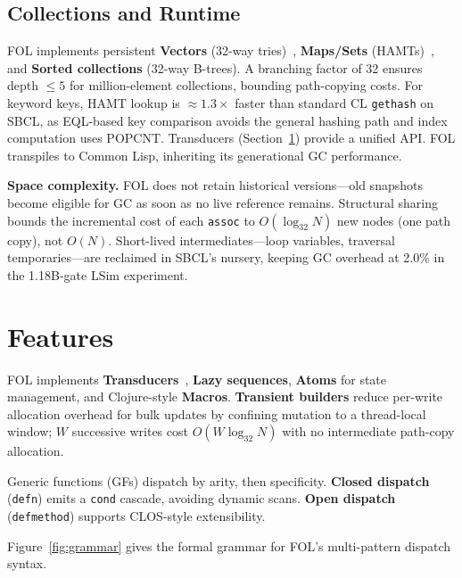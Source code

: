 \documentclass[sigconf,nonacm]{acmart}
\begin{document}
\subsection{Collections and Runtime}
FOL implements persistent \textbf{Vectors} (32-way tries)~\cite{Okasaki1998}, \textbf{Maps/Sets} (HAMTs)~\cite{Bagwell2000}, and \textbf{Sorted collections} (32-way B-trees). A branching factor of 32 ensures depth $\le 5$ for million-element collections, bounding path-copying costs. For keyword keys, HAMT lookup is $\approx$$1.3\times$ faster than standard CL \texttt{gethash} on SBCL, as EQL-based key comparison avoids the general hashing path and index computation uses POPCNT. Transducers (Section~\ref{sec:features}) provide a unified API. FOL transpiles to Common Lisp, inheriting its generational GC performance.

\textbf{Space complexity.} FOL does not retain historical versions---old snapshots become eligible for GC as soon as no live reference remains. Structural sharing bounds the incremental cost of each \texttt{assoc} to $O(\log_{32} N)$ new nodes (one path copy), not $O(N)$. Short-lived intermediates---loop variables, traversal temporaries---are reclaimed in SBCL's nursery, keeping GC overhead at 2.0\% in the 1.18B-gate LSim experiment.

\section{Features}
\label{sec:features}

FOL implements \textbf{Transducers}~\cite{Hickey2014}, \textbf{Lazy sequences}, \textbf{Atoms} for state management, and Clojure-style \textbf{Macros}. \textbf{Transient builders} reduce per-write allocation overhead for bulk updates by confining mutation to a thread-local window; $W$ successive writes cost $O(W \log_{32} N)$ with no intermediate path-copy allocation.

Generic functions (GFs) dispatch by arity, then specificity. \textbf{Closed dispatch} (\texttt{defn}) emits a \texttt{cond} cascade, avoiding dynamic scans. \textbf{Open dispatch} (\texttt{defmethod}) supports CLOS-style extensibility.

Figure~\ref{fig:grammar} gives the formal grammar for FOL's multi-pattern dispatch syntax.
\end{document}
